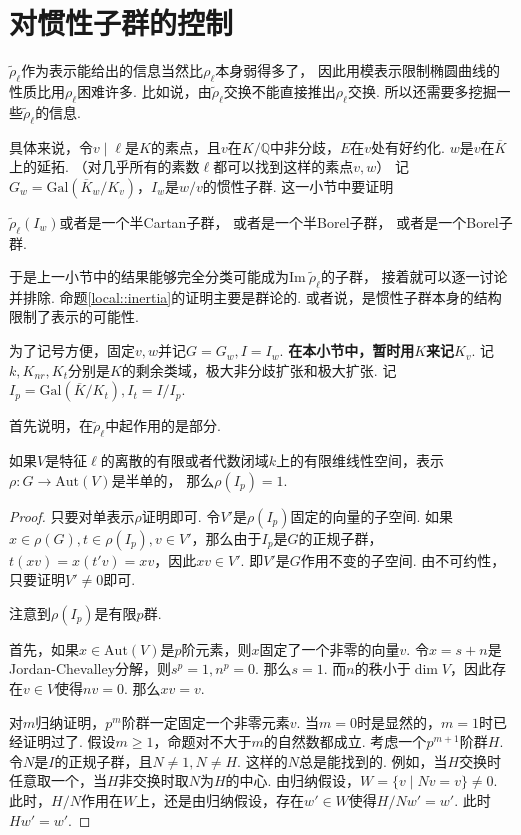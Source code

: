 \section{对惯性子群的控制}

$\tilde{\rho}_{\ell}$作为表示能给出的信息当然比$\rho_{\ell}$本身弱得多了，
因此用模表示限制椭圆曲线的性质比用$\rho_{\ell}$困难许多.
比如说，由$\tilde{\rho}_{\ell}$交换不能直接推出$\rho_{\ell}$交换.
所以还需要多挖掘一些$\tilde{\rho}_{\ell}$的信息.

具体来说，令$v\mid \ell$是$K$的素点，且$v$在$K/\mathbb{Q}$中非分歧，$E$在$v$处有好约化.
$w$是$v$在$\overline{K}$上的延拓.
（对几乎所有的素数$\ell$都可以找到这样的素点$v, w$）
记$G_w=\mathrm{Gal}(\overline{K}_w/K_v)$，$I_w$是$w/v$的惯性子群.
这一小节中要证明
\begin{cprop}
    $\tilde{\rho}_{\ell}(I_w)$或者是一个半Cartan子群，
    或者是一个半Borel子群，
    或者是一个Borel子群. \label{local::inertia}
\end{cprop}

于是上一小节中的结果能够完全分类可能成为$\mathrm{Im}\ \tilde{\rho}_{\ell}$的子群，
接着就可以逐一讨论并排除.
命题\ref{local::inertia}的证明主要是群论的. 或者说，是惯性子群本身的结构限制了表示的可能性.

为了记号方便，固定$v,w$并记$G = G_w, I = I_w$.
{\bfseries 在本小节中，暂时用$K$来记$K_v$}. 记$k,K_{nr},K_{t}$分别是$K$的剩余类域，极大非分歧扩张和极大\tame 扩张.
记$I_p = \mathrm{Gal}(\overline{K}/K_t), I_t = I/I_p$.

首先说明，在$\tilde{\rho}_{\ell}$中起作用的是\tame 部分.

\begin{cprop}
    如果$V$是特征$\ell$的离散的有限或者代数闭域$k$上的有限维线性空间，表示$\rho: G\to \mathrm{Aut}(V)$是半单的，
    那么$\rho(I_p) = 1$.
\end{cprop}

\begin{proof}
    只要对单表示$\rho$证明即可. 令$V'$是$\rho(I_p)$固定的向量的子空间.
    如果$x\in \rho(G),t\in \rho(I_p), v\in V'$，那么由于$I_p$是$G$的正规子群，
    $t(xv) = x(t'v)=xv$，因此$xv\in V'$. 即$V'$是$G$作用不变的子空间.
    由不可约性，只要证明$V'\neq 0$即可.
    
    注意到$\rho(I_p)$是有限$p$群.

    首先，如果$x\in\mathrm{Aut}(V)$是$p$阶元素，则$x$固定了一个非零的向量$v$.
    令$x=s+n$是Jordan-Chevalley分解，则$s^p = 1, n^p = 0$. 那么$s = 1$.
    而$n$的秩小于$\dim V$，因此存在$v\in V$使得$nv=0$. 那么$xv = v$.

    对$m$归纳证明，$p^m$阶群一定固定一个非零元素$v$. 当$m=0$时是显然的，$m=1$时已经证明过了.
    假设$m\geq 1$，命题对不大于$m$的自然数都成立. 考虑一个$p^{m+1}$阶群$H$.
    令$N$是$I$的正规子群，且$N\neq 1,N\neq H$. 这样的$N$总是能找到的.
    例如，当$H$交换时任意取一个，当$H$非交换时取$N$为$H$的中心.
    由归纳假设，$W = \{v\mid Nv=v\}\neq 0$.
    此时，$H/N$作用在$W$上，还是由归纳假设，存在$w'\in W$使得$H/N w' = w'$.
    此时$Hw' = w'$.
\end{proof}

